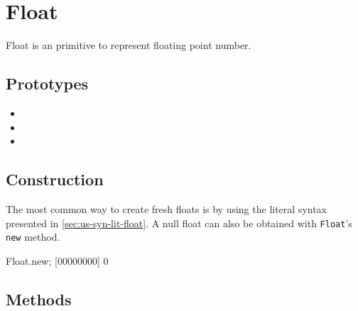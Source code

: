 \section{Float}

Float is an \us primitive to represent floating point number.

\subsection{Prototypes}

\begin{itemize}
\item {}
\item {}
\item {}
\end{itemize}

\subsection{Construction}

The most common way to create fresh floats is by using the literal
syntax presented in \autoref{sec:us-syn-lit-float}. A null float can
also be obtained with \lstinline|Float|'s \lstinline|new| method.

\begin{urbiscript}
Float.new;
[00000000] 0
\end{urbiscript}

\subsection{Methods}

